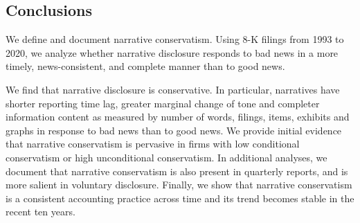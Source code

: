 \documentclass[letterpaper,12pt]{article}
\begin{document}
\begin{spacing}{1.5}
\section{Conclusions}

\noindent We define and document narrative conservatism. Using 8-K filings from 1993 to 2020, we analyze whether narrative disclosure responds to bad news in a more timely, news-consistent, and complete manner than to good news. 

We find that narrative disclosure is conservative. In particular, narratives have shorter reporting time lag, greater marginal change of tone and completer information content as measured by number of words, filings, items, exhibits and graphs in response to bad news than to good news. We provide initial evidence that narrative conservatism is pervasive in firms with low conditional conservatism or high unconditional conservatism. In additional analyses, we document that narrative conservatism is also present in quarterly reports, and is more salient in voluntary disclosure. Finally, we show that narrative conservatism is a consistent accounting practice across time and its trend becomes stable in the recent ten years. 


\end{spacing}
\end{document}
